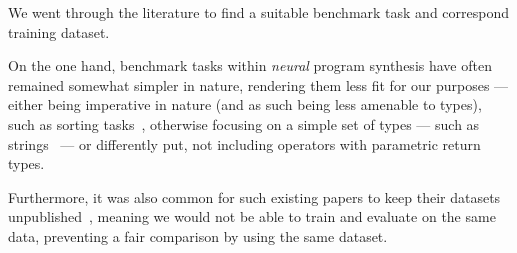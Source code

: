 \documentclass{article}
\begin{document}

We went through the literature to find a suitable benchmark task and correspond training dataset.

On the one hand, benchmark tasks within \emph{neural} program synthesis have often remained somewhat simpler in nature,
rendering them less fit for our purposes ---
either being imperative in nature (and as such being less amenable to types),
such as sorting tasks~\citep{npi,alphanpi},
otherwise focusing on a simple set of types --- such as strings~\citep{nsps} ---%
or differently put, not including operators with parametric return types.

Furthermore, it was also common for such existing papers to keep their datasets unpublished~\citep{nsps,deepcoder},
meaning we would not be able to train and evaluate on the same data,
preventing a fair comparison by using the same dataset.
\end{document}
